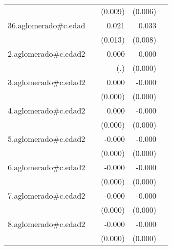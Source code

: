 {\begin{longtable}{l*{4}{D{.}{.}{-1}}}
            &                     &     (0.009)         &     (0.006)         &                     \\
\addlinespace
36.aglomerado#c.edad&                     &       0.021         &       0.033\sym{***}&                     \\
            &                     &     (0.013)         &     (0.008)         &                     \\
\addlinespace
2.aglomerado#c.edad2&                     &       0.000         &      -0.000\sym{**} &                     \\
            &                     &         (.)         &     (0.000)         &                     \\
\addlinespace
3.aglomerado#c.edad2&                     &       0.000         &      -0.000         &                     \\
            &                     &     (0.000)         &     (0.000)         &                     \\
\addlinespace
4.aglomerado#c.edad2&                     &       0.000         &      -0.000         &                     \\
            &                     &     (0.000)         &     (0.000)         &                     \\
\addlinespace
5.aglomerado#c.edad2&                     &      -0.000         &      -0.000\sym{**} &                     \\
            &                     &     (0.000)         &     (0.000)         &                     \\
\addlinespace
6.aglomerado#c.edad2&                     &      -0.000         &      -0.000\sym{*}  &                     \\
            &                     &     (0.000)         &     (0.000)         &                     \\
\addlinespace
7.aglomerado#c.edad2&                     &      -0.000         &      -0.000         &                     \\
            &                     &     (0.000)         &     (0.000)         &                     \\
\addlinespace
8.aglomerado#c.edad2&                     &      -0.000         &      -0.000         &                     \\
            &                     &     (0.000)         &     (0.000)         &                     \\

\end{longtable}}

